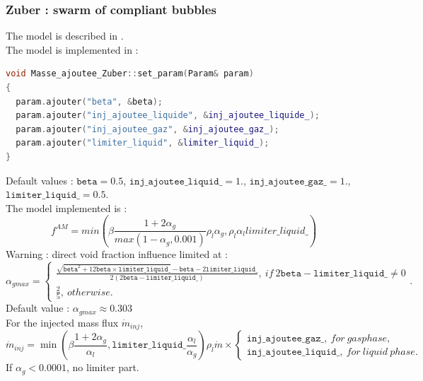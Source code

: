 \subsubsection{Zuber : swarm of compliant bubbles}
The model is described in \cite{ZUBER1964897}.\\
The model is implemented in :
\begin{lstlisting}[language=c++]
void Masse_ajoutee_Zuber::set_param(Param& param)
{
  param.ajouter("beta", &beta);
  param.ajouter("inj_ajoutee_liquide", &inj_ajoutee_liquide_);
  param.ajouter("inj_ajoutee_gaz", &inj_ajoutee_gaz_);
  param.ajouter("limiter_liquid", &limiter_liquid_);
}
\end{lstlisting}
Default values : $\texttt{beta}=0.5$, $\texttt{inj\_ajoutee\_liquid\_}=1.$, $\texttt{inj\_ajoutee\_gaz\_}=1.$, $\texttt{limiter\_liquid\_} = 0.5$.\\
The model implemented is :
\begin{equation}
   f^{AM}=min(\beta\frac{1+2\alpha_g}{max(1-\alpha_g,0.001)} \rho_l\alpha_g,\rho_l\alpha_l limiter\_liquid\_ )
\end{equation}
{\color{red} Warning} : direct void fraction influence limited at :
\begin{equation}
    \alpha_{gmax}=\begin{cases}
        \frac{\sqrt{\texttt{beta}^2+12\texttt{beta}\times \texttt{limiter\_liquid\_}}-\texttt{beta}-2\texttt{limiter\_liquid\_}}{2(2\texttt{beta}-\texttt{limiter\_liquid\_})},\ if\ 2\texttt{beta}-\texttt{limiter\_liquid\_}\neq 0 \\
        \frac{2}{5},\ otherwise.
    \end{cases}.
\end{equation}
Default value : $\alpha_{gmax}\approx 0.303$\\
For the injected mass flux $\dot{m}_{inj}$,
\begin{equation}
   \dot{m}_{inj}=\min(\beta\frac{1+2\alpha_g}{\alpha_l},\texttt{limiter\_liquid\_}\frac{\alpha_l}{\alpha_g}) \rho_l\dot{m}\times\begin{cases} \texttt{inj\_ajoutee\_gaz\_},\ for\ gas phase,\\ \texttt{inj\_ajoutee\_liquid\_},\ for\ liquid\ phase.
   \end{cases}
\end{equation}
If $\alpha_g< 0.0001$, no limiter part.\\

